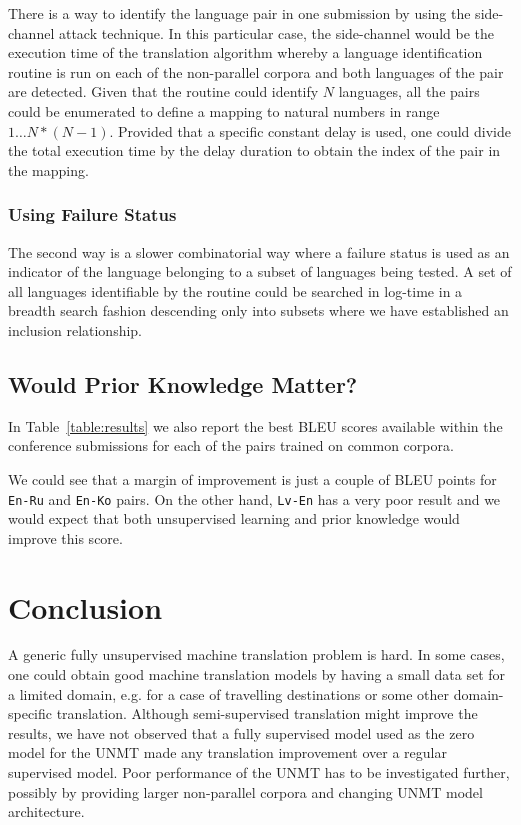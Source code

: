 \documentclass[]{article}
\begin{document}
There is a way to identify the language pair in one submission by using the side-channel attack technique.
In this particular case, the side-channel would be the execution time of the translation algorithm whereby a language identification routine is run on each of the non-parallel corpora and both languages of the pair are detected.
Given that the routine could identify $N$ languages, all the pairs could be enumerated to define a mapping to natural numbers in range $1\dots N*(N-1)$.
Provided that a specific constant delay is used, one could divide the total execution time by the delay duration to obtain the index of the pair in the mapping.

\subsubsection{Using Failure Status}

The second way is a slower combinatorial way where a failure status is used as an indicator of the language belonging to a subset of languages being tested.
A set of all languages identifiable by the routine could be searched in log-time in a breadth search fashion descending only into subsets where we have established an inclusion relationship.

\subsection{Would Prior Knowledge Matter?}
\label{sect:prior}

In Table~\ref{table:results} we also report the best BLEU scores available within the conference submissions for each of the pairs trained on common corpora.

We could see that a margin of improvement is just a couple of BLEU points for {\tt En-Ru} and {\tt En-Ko} pairs.
On the other hand, {\tt Lv-En} has a very poor result and we would expect that both unsupervised learning and prior knowledge would improve this score.


\section{Conclusion}

A generic fully unsupervised machine translation problem is hard.
In some cases, one could obtain good machine translation models by having a small data set for a limited domain, e.g. for a case of travelling destinations or some other domain-specific translation.
Although semi-supervised translation might improve the results, we have not observed that a fully supervised model used as the zero model for the \ac{UNMT} made any translation improvement over a regular supervised model.
Poor performance of the \ac{UNMT} has to be investigated further, possibly by providing larger non-parallel corpora and changing \ac{UNMT} model architecture.

\small



\end{document}
